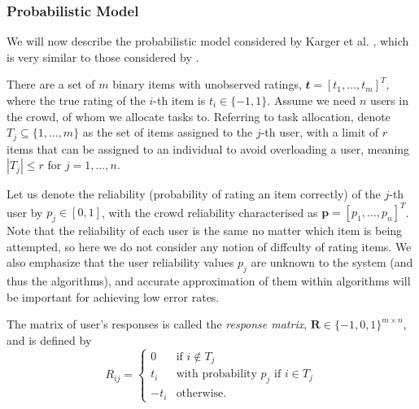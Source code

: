 \documentclass[12pt]{article}
\numberwithin{equation}{section}
\begin{document}
\subsubsection{Probabilistic Model}
\label{sec:background;subsec:crowdsourcingSystems;subsubsec:probabilisticModel}

We will now describe the probabilistic model considered by Karger et al. \cite{KOS13}, which is very similar to those considered by \cite{GKM11,DDK+13}.

There are a set of $m$ binary items with unobserved ratings, $\mathbfit{t} = [t_{1},\dots,t_{m}]^{T}$, where the true rating of the $i$-th item is $t_{i} \in \{-1,1\}$. Assume we need $n$ users in the crowd, of whom we allocate tasks to. Referring to task allocation, denote $T_{j} \subseteq \{1,\dots,m\}$ as the set of items assigned to the $j$-th user, with a limit of $r$ items that can be assigned to an individual to avoid overloading a user, meaning $\left\vert{T_{j}}\right\vert \le r \text{ for } j=1,\dots,n$.

Let us denote the reliability (probability of rating an item correctly) of the $j$-th user by $p_{j} \in [0,1]$, with the crowd reliability characterised as $\mathbf{p} = [p_{1},\dots,p_{n}]^{T}$. Note that the reliability of each user is the same no matter which item is being attempted, so here we do not consider any notion of diffculty of rating items. We also emphasize that the user reliability values $p_{j}$ are unknown to the system (and thus the algorithms), and accurate approximation of them within algorithms will be important for achieving low error rates.

The matrix of user's responses is called the \textit{response matrix}, $\mathbf{R} \in \{-1,0,1\}^{m \times n}$, and is defined by
\begin{equation*}
	R_{ij} =
	\begin{cases}
		0 & \text{if } i \not \in T_{j}\\
		t_{i} & \text{with probability }  p_{j} \text{ if } i \in T_{j}\\
		-t_{i} & \text{otherwise}.
	\end{cases}
\end{equation*}
\end{document}
